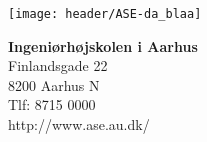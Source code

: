 

{}
\thispagestyle{empty}

\begin{minipage}[t]{0.68\textwidth}
\vspace*{-8pt}			
\texttt{[image: header/ASE-da\_blaa]}
\end{minipage}
\hfill
\begin{minipage}[t]{0.48\textwidth}
{\small 
\textbf{Ingeniørhøjskolen i Aarhus}\\
Finlandsgade 22 \\
8200 Aarhus N \\
Tlf: 8715 0000 \\
http://www.ase.au.dk/}
\end{minipage}

\vspace*{3cm}

